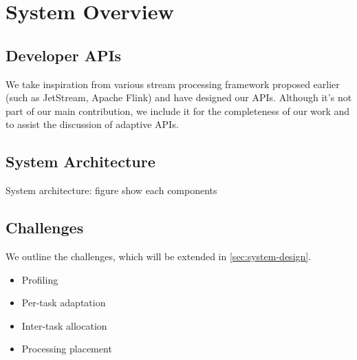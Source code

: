 \section{System Overview}
\label{sec:system-overview}

\subsection{Developer APIs}
\label{sec:developer-apis}

We take inspiration from various stream processing framework proposed earlier
(such as JetStream, Apache Flink) and have designed our APIs. Although it's not
part of our main contribution, we include it for the completeness of our work
and to assist the discussion of adaptive APIs.

\subsection{System Architecture}
\label{sec:system-architecture}

System architecture: figure show each components

\subsection{Challenges}
\label{sec:challenges}

We outline the challenges, which will be extended in \autoref{sec:system-design}.

\begin{itemize}
\item Profiling
\item Per-task adaptation
\item Inter-task allocation
\item Processing placement
\end{itemize}

